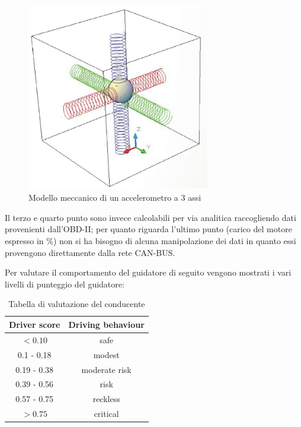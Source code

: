 \documentclass[12pt, a4paper, italian]{report}
\numberwithin{figure}{chapter}
\numberwithin{table}{chapter}
\begin{document}
\begin{figure}[h]
  \centering
  \includegraphics[width=8cm]{Accelerometro.jpg}
  \caption{Modello meccanico di un accelerometro a 3 assi}
  \label{fig:accelerometro}
\end{figure}

Il terzo e quarto punto sono invece calcolabili per via analitica raccogliendo dati provenienti dall'OBD-II; per quanto riguarda l'ultimo punto (carico del motore espresso in \%) non si ha bisogno di alcuna manipolazione dei dati in quanto essi provengono direttamente dalla rete CAN-BUS.

Per valutare il comportamento del guidatore di seguito vengono mostrati i vari livelli di punteggio del guidatore:

\vspace{1cm}

\begin{table}[h!]
  \centering
  \begin{tabular}{|c|c|}
    \hline
    \textbf{Driver score} & \textbf{Driving behaviour} \\
    \hline
    \(< 0.10\) & safe \\
    \hline
    0.1 - 0.18 & modest \\
    \hline
    0.19 - 0.38 & moderate risk \\
    \hline
    0.39 - 0.56 & risk \\
    \hline
     0.57 - 0.75 & reckless \\
    \hline
     \(> 0.75\) & critical \\
    \hline
  \end{tabular}
  \caption{Tabella di valutazione del conducente}
  \label{tab:tabellaValutativa}
\end{table}
\end{document}
